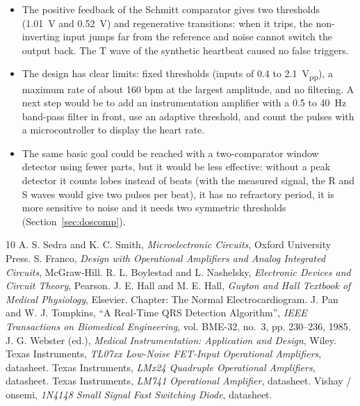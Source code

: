 \documentclass[11pt,letterpaper]{article}
\begin{document}
\begin{itemize}
  \item The positive feedback of the Schmitt comparator gives two thresholds (\SI{1.01}{V} and \SI{0.52}{V}) and regenerative transitions: when it trips, the non-inverting input jumps far from the reference and noise cannot switch the output back. The T wave of the synthetic heartbeat caused no false triggers.
  \item The design has clear limits: fixed thresholds (inputs of 0.4 to \SI{2.1}{V_{pp}}), a maximum rate of about 160 bpm at the largest amplitude, and no filtering. A next step would be to add an instrumentation amplifier with a 0.5 to \SI{40}{Hz} band-pass filter in front, use an adaptive threshold, and count the pulses with a microcontroller to display the heart rate.
  \item The same basic goal could be reached with a two-comparator window detector using fewer parts, but it would be less effective: without a peak detector it counts lobes instead of beats (with the measured signal, the R and S waves would give two pulses per beat), it has no refractory period, it is more sensitive to noise and it needs two symmetric thresholds (Section~\ref{sec:doscomp}).
\end{itemize}

\begin{thebibliography}{10}
 A. S. Sedra and K. C. Smith, \emph{Microelectronic Circuits}, Oxford University Press.
 S. Franco, \emph{Design with Operational Amplifiers and Analog Integrated Circuits}, McGraw-Hill.
 R. L. Boylestad and L. Nashelsky, \emph{Electronic Devices and Circuit Theory}, Pearson.
 J. E. Hall and M. E. Hall, \emph{Guyton and Hall Textbook of Medical Physiology}, Elsevier. Chapter: The Normal Electrocardiogram.
 J. Pan and W. J. Tompkins, ``A Real-Time QRS Detection Algorithm'', \emph{IEEE Transactions on Biomedical Engineering}, vol. BME-32, no.~3, pp. 230--236, 1985.
 J. G. Webster (ed.), \emph{Medical Instrumentation: Application and Design}, Wiley.
 Texas Instruments, \emph{TL07xx Low-Noise FET-Input Operational Amplifiers}, datasheet.
 Texas Instruments, \emph{LMx24 Quadruple Operational Amplifiers}, datasheet.
 Texas Instruments, \emph{LM741 Operational Amplifier}, datasheet.
 Vishay / onsemi, \emph{1N4148 Small Signal Fast Switching Diode}, datasheet.
\end{thebibliography}
\end{document}

